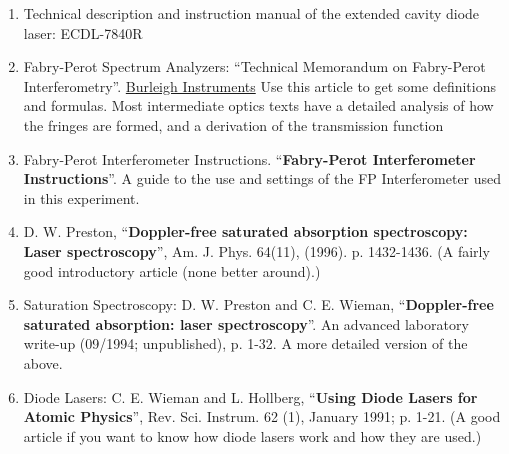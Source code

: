 \documentclass{../lab}
\begin{document}
\begin{enumerate}
    \item Technical description and instruction manual of the extended cavity diode laser: ECDL-7840R

    \item Fabry-Perot Spectrum Analyzers: ``Technical Memorandum on Fabry-Perot Interferometry''. \href{https://berkeley-physics111b.github.io/assets/pdf/oldwebsitestructure/tech-memo-fp-interferometry.pdf}{Burleigh Instruments} Use this article to get some definitions and formulas. Most intermediate optics texts have a detailed analysis of how the fringes are formed, and a derivation of the transmission function

    \item Fabry-Perot Interferometer Instructions. ``\textbf{Fabry-Perot Interferometer Instructions}''. A guide to the use and settings of the FP Interferometer used in this experiment.

    \item D. W. Preston, ``\textbf{Doppler-free saturated absorption spectroscopy: Laser spectroscopy}'', Am. J. Phys. 64(11), (1996). p. 1432-1436. (A fairly good introductory article (none better around).) 
    
    \item Saturation Spectroscopy: D. W. Preston and C. E. Wieman, ``\textbf{Doppler-free saturated absorption: laser spectroscopy}''. An advanced laboratory write-up (09/1994; unpublished), p. 1-32. A more detailed version of the above.

    \item Diode Lasers: C. E. Wieman and L. Hollberg, ``\textbf{Using Diode Lasers for Atomic Physics}'', Rev. Sci. Instrum. 62 (1), January 1991; p. 1-21. (A good article if you want to know how diode lasers work and how they are used.)


\end{enumerate}
\end{document}
